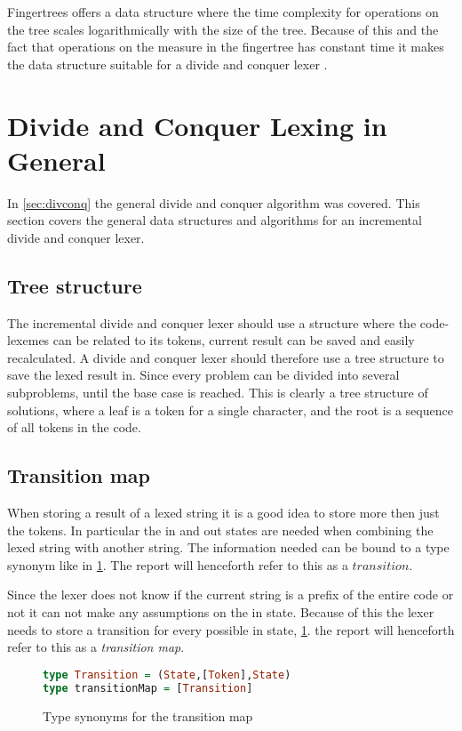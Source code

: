 \newpage

Fingertrees offers a data structure where the time complexity for operations on
the tree scales logarithmically with the size of the tree. Because of this and
the fact that operations on the measure in the fingertree has constant time it
makes the data structure suitable for a divide and conquer lexer
\cite{fingertree}.

\section{Divide and Conquer Lexing in General}
In \cref{sec:divconq} the general divide and conquer algorithm was covered. This
section covers the general data structures and algorithms for an incremental
divide and conquer lexer.

\subsection{Tree structure}
The incremental divide and conquer lexer should use a structure where the
code-lexemes can be related to its tokens, current result can be saved and
easily recalculated. A divide and conquer lexer should therefore use a tree
structure to save the lexed result in. Since every problem can be divided into
several subproblems, until the base case is reached. This is clearly a tree
structure of solutions, where a leaf is a token for a single character, and the
root is a sequence of all tokens in the code.  

\subsection{Transition map}
When storing a result of a lexed string it is a good idea to store more then
just the tokens. In particular the in and out states are needed when combining
the lexed string with another string. The information needed can be bound to a
type synonym like in \cref{fig:transitionMap}. The report will henceforth refer
to this as a $transition$.

Since the lexer does not know if the current string is a prefix of the entire
code or not it can not make any assumptions on the in state. Because of this the
lexer needs to store a transition for every possible in state,
\cref{fig:transitionMap}. the report will henceforth refer to this as a
\emph{transition map}.

\begin{figure}[h!]
\begin{lstlisting}[language=Haskell]
type Transition = (State,[Token],State)
type transitionMap = [Transition]
\end{lstlisting}
\caption{Type synonyms for the transition map \label{fig:transitionMap}}
\end{figure}

